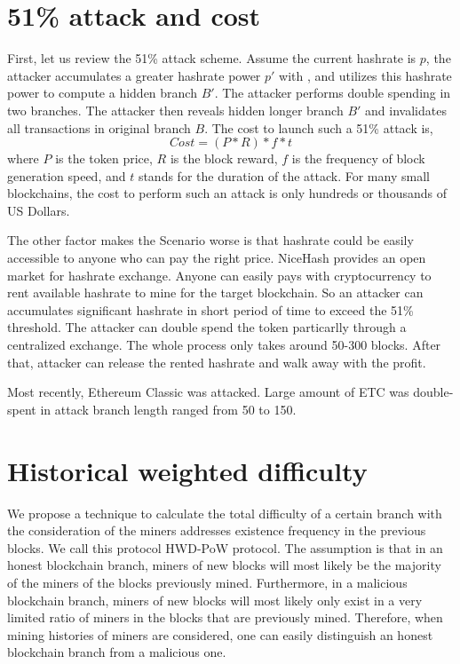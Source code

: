 \documentclass[conference]{IEEEtran}
\begin{document}
\section{51\% attack and cost}
First, let us review the 51\% attack scheme. Assume the current hashrate is $p$, the attacker accumulates a greater hashrate power $p'$ with , and utilizes this hashrate power to compute a hidden branch $B'$. The attacker performs double spending in two branches. The attacker then reveals hidden longer branch $B'$ and invalidates all transactions in original branch $B$. The cost to launch such a 51\% attack is,
\begin{equation}
Cost=(P*R)*f*t\label{eq_cost}
\end{equation}
where $P$ is the token price, $R$ is the block reward, $f$ is the frequency of block generation speed, and $t$ stands for the duration of the attack.
For many small blockchains, the cost to perform such an attack is only hundreds or thousands of US Dollars\cite{b9}.

The other factor makes the Scenario worse is that hashrate could be easily accessible to anyone who can pay the right price. NiceHash\cite{b10} provides an open market for hashrate exchange. Anyone can easily pays with cryptocurrency to rent available hashrate to mine for the target blockchain. So an attacker can accumulates significant hashrate in short period of time to exceed the 51\% threshold. The attacker can double spend the token particarlly through a centralized exchange. The whole process only takes around 50-300 blocks. After that, attacker can release the rented hashrate and walk away with the profit. 

Most recently, Ethereum Classic\cite{b11} was attacked. Large amount of ETC was double-spent in attack branch length ranged from 50 to 150.

\section{Historical weighted difficulty}

We propose a technique to calculate the total difficulty of a certain branch with the consideration of the miners addresses existence frequency in the previous blocks. We call this protocol HWD-PoW protocol. The assumption is that in an honest blockchain branch, miners of new blocks will most likely be the majority of the miners of the blocks previously mined. Furthermore, in a malicious blockchain branch, miners of new blocks will most likely only exist in a very limited ratio of miners in the blocks that are previously mined. Therefore, when mining histories of miners are considered, one can easily distinguish an honest blockchain branch from a malicious one.
\end{document}
